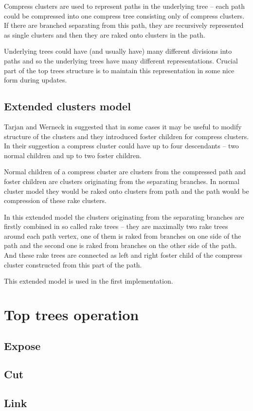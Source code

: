 Compress clusters are used to represent paths in the underlying tree -- each
path could be compressed into one {\I compress tree} consisting only of compress
clusters. If there are branched separating from this path, they are recursively
represented as single clusters and then they are raked onto clusters in the path.

Underlying trees could have (and usually have) many different divisions into
paths and so the underlying trees have many different representations. Crucial
part of the top trees structure is to maintain this representation in some nice
form during updates.

\subsection{Extended clusters model}

Tarjan and Werneck in \cite{SelfAdjustingTT} suggested that in some cases it may
be useful to modify structure of the clusters and they introduced
{\I foster children} for {\I compress clusters}. In their suggestion a compress
cluster could have up to four descendants -- two normal children and up to two
foster children.

Normal children of a compress cluster are clusters from the compressed path and
foster children are clusters originating from the separating branches. In normal
cluster model they would be raked onto clusters from path and the path would be
compression of these rake clusters.

In this extended model the clusters originating from the separating branches are
firstly combined in so called {\I rake trees} -- they are maximally two rake
trees around each path vertex, one of them is raked from branches on one side of
the path and the second one is raked from branches on the other side of the
path. And these rake trees are connected as left and right foster child of the
compress cluster constructed from this part of the path.


This extended model is used in the first implementation.

\section{Top trees operation}

\subsection{Expose}

\subsection{Cut}

\subsection{Link}

